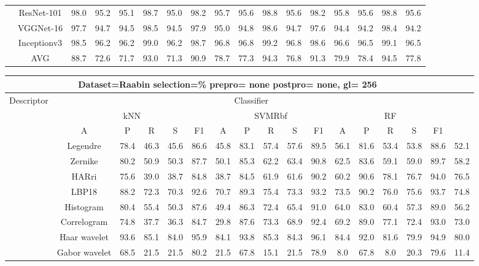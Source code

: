 \documentclass[12pt,italian]{article}
\begin{document}
\begin{tiny}
\begin{longtable}{lcccccccccccccccc}
& ResNet-101 & 98.0 & 95.2 & 95.1 & 98.7 & 95.0 & 98.2 & 95.7 & 95.6 & 98.8 & 95.6 & 98.2 & 95.8 & 95.6 & 98.8 & 95.6 \\ 
& VGGNet-16 & 97.7 & 94.7 & 94.5 & 98.5 & 94.5 & 97.9 & 95.0 & 94.8 & 98.6 & 94.7 & 97.6 & 94.4 & 94.2 & 98.4 & 94.2 \\ 
& Inceptionv3 & 98.5 & 96.2 & 96.2 & 99.0 & 96.2 & 98.7 & 96.8 & 96.8 & 99.2 & 96.8 & 98.6 & 96.6 & 96.5 & 99.1 & 96.5 \\ 
\hline
& AVG & 88.7 & 72.6 & 71.7 & 93.0 & 71.3 & 90.9 & 78.7 & 77.3 & 94.3 & 76.8 & 91.3 & 79.9 & 78.4 & 94.5 & 77.8 \\ 
\hline
\bottomrule
\end{longtable} 

 \pagebreak 
\begin{longtable}{lcccccccccccccccc}
\toprule
\multicolumn{16}{c}{Dataset=Raabin selection=\% prepro= none postpro= none, gl= 256} \\ 
\toprule
Descriptor & \multicolumn{15}{c}{Classifier} \\ 
& \multicolumn{5}{c}{kNN} & \multicolumn{5}{c}{SVMRbf} & \multicolumn{5}{c}{RF} \\ 
& A & P & R & S & F1 & A & P & R & S & F1 & A & P & R & S & F1 \\ 
\midrule
& Legendre & 78.4 & 46.3 & 45.6 & 86.6 & 45.8 & 83.1 & 57.4 & 57.6 & 89.5 & 56.1 & 81.6 & 53.4 & 53.8 & 88.6 & 52.1 \\ 
& Zernike & 80.2 & 50.9 & 50.3 & 87.7 & 50.1 & 85.3 & 62.2 & 63.4 & 90.8 & 62.5 & 83.6 & 59.1 & 59.0 & 89.7 & 58.2 \\ 
& HARri & 75.6 & 39.0 & 38.7 & 84.8 & 38.7 & 84.5 & 61.9 & 61.6 & 90.2 & 60.2 & 90.6 & 78.1 & 76.7 & 94.0 & 76.5 \\ 
& LBP18 & 88.2 & 72.3 & 70.3 & 92.6 & 70.7 & 89.3 & 75.4 & 73.3 & 93.2 & 73.5 & 90.2 & 76.0 & 75.6 & 93.7 & 74.8 \\ 
& Histogram & 80.4 & 55.4 & 50.3 & 87.6 & 49.4 & 86.3 & 72.4 & 65.4 & 91.0 & 64.0 & 83.0 & 60.4 & 57.3 & 89.0 & 56.2 \\ 
& Correlogram & 74.8 & 37.7 & 36.3 & 84.7 & 29.8 & 87.6 & 73.3 & 68.9 & 92.4 & 69.2 & 89.0 & 77.1 & 72.4 & 93.0 & 73.0 \\ 
& Haar wavelet & 93.6 & 85.1 & 84.0 & 95.9 & 84.1 & 93.8 & 85.3 & 84.3 & 96.1 & 84.4 & 92.0 & 81.6 & 79.9 & 94.9 & 80.0 \\ 
& Gabor wavelet & 68.5 & 21.5 & 21.5 & 80.2 & 21.5 & 67.8 & 15.1 & 21.5 & 78.9 &  8.0 & 67.8 &  8.0 & 20.3 & 79.6 & 11.4 \\ 

\end{longtable}
\end{tiny}
\end{document}
